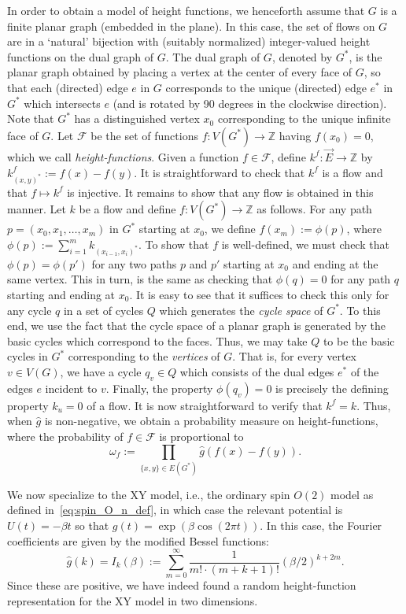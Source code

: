 \documentclass[12pt,reqno]{article}
\def\Z{\mathbb{Z}}
\newcommand{\cF}{\mathcal{F}}
\begin{document}
In order to obtain a model of height functions, we henceforth assume that $G$ is a finite planar graph (embedded in the plane). In this case, the set of flows on $G$ are in a `natural' bijection with (suitably normalized) integer-valued height functions on the dual graph of $G$.
The dual graph of $G$, denoted by $G^*$, is the planar graph obtained by
placing a vertex at the center of every face of $G$, so
that each (directed) edge $e$ in $G$ corresponds to the unique (directed) edge $e^*$ in $G^*$ which intersects $e$ (and is rotated by 90 degrees in the clockwise direction). Note that $G^*$ has a distinguished vertex $x_0$ corresponding to the unique infinite face of $G$. Let $\cF$ be the set of functions $f \colon V(G^*) \to \Z$ having $f(x_0)=0$, which we call \emph{height-functions}. Given a function $f \in \cF$, define $k^f \colon \vec{E} \to \Z$ by $k^f_{(x,y)^*} := f(x)-f(y)$. It is straightforward to check that $k^f$ is a flow and that $f \mapsto k^f$ is injective. It remains to show that any flow is obtained in this manner. Let $k$ be a flow and define $f \colon V(G^*) \to \Z$ as follows.
For any path $p=(x_0,x_1,\dots,x_m)$ in $G^*$ starting at $x_0$, we define $f(x_m) := \phi(p)$, where $\phi(p) := \sum_{i=1}^m k_{(x_{i-1},x_i)^*}$. To show that $f$ is well-defined, we must check that $\phi(p)=\phi(p')$ for any two paths $p$ and $p'$ starting at $x_0$ and ending at the same vertex. This in turn, is the same as checking that $\phi(q)=0$ for any path $q$ starting and ending at $x_0$. It is easy to see that it suffices to check this only for any cycle $q$ in a set of cycles $Q$ which generates the \emph{cycle space} of $G^*$. To this end, we use the fact that the cycle space of a planar graph is generated by the basic cycles which correspond to the faces. Thus, we may take $Q$ to be the basic cycles in $G^*$ corresponding to the \emph{vertices} of $G$. That is, for every vertex $v \in V(G)$, we have a cycle $q_v \in Q$ which consists of the dual edges $e^*$ of the edges $e$ incident to $v$.
Finally, the property $\phi(q_v)=0$ is precisely the defining property $k_u=0$ of a flow.
It is now straightforward to verify that $k^f=k$.
Thus, when $\hat{g}$ is non-negative, we obtain a probability measure on height-functions, where the probability of $f \in \cF$ is proportional to
\[ \omega_f := \prod_{\{x,y\} \in E(G^*)} \hat{g}(f(x)-f(y)) .\]

We now specialize to the XY model, i.e., the ordinary spin $O(2)$ model as defined in~\eqref{eq:spin_O_n_def}, in which case the relevant potential is $U(t) = -\beta t$ so that $g(t) = \exp(\beta \cos(2\pi t))$. In this case, the Fourier coefficients are given by the modified Bessel functions:
\[ \hat{g}(k) = I_k(\beta) := \sum_{m=0}^\infty \frac{1}{m!\cdot (m+k+1)!} (\beta/2)^{k+2m} .\]
Since these are positive, we have indeed found a random height-function representation for the XY model in two dimensions.
\end{document}
